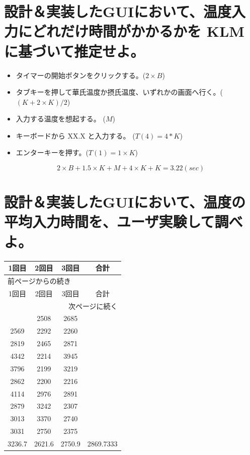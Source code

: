 \documentclass{scrartcl}
\begin{document}
\section{設計＆実装したGUIにおいて、温度入力にどれだけ時間がかかるかを KLM に基づいて推定せよ。}
\label{sec:org655c47f}
\begin{itemize}
\item タイマーの開始ボタンをクリックする。(\(2\times B\))\\
\item タブキーを押して華氏温度か摂氏温度、いずれかの画面へ行く。(\((K + 2 \times K) / 2\))\\
\item 入力する温度を想起する。 (\(M\))\\
\item キーボードから XX.X と入力する。 (\(T(4)=4*K\))\\
\item エンターキーを押す。(\(T(1)=1\times K\))\\
\end{itemize}
\begin{equation*}
2\times B + 1.5 \times K + M + 4 \times K + K = 3.22(sec)
\end{equation*}
\section{設計＆実装したGUIにおいて、温度の平均入力時間を、ユーザ実験して調べよ。}
\label{sec:orgb3f5f3b}
\begin{longtable}{|c|c|c||c|}
\hline
1回目 & 2回目 & 3回目 & 合計\\
\hline
\endfirsthead
\multicolumn{4}{l}{前ページからの続き} \\
\hline

1回目 & 2回目 & 3回目 & 合計 \\

\hline
\endhead
\hline\multicolumn{4}{r}{次ページに続く} \\
\endfoot
\endlastfoot
\hline
2942 & 2508 & 2685 & \\
2569 & 2292 & 2260 & \\
2819 & 2465 & 2871 & \\
4342 & 2214 & 3945 & \\
3796 & 2199 & 3219 & \\
2862 & 2200 & 2216 & \\
4114 & 2976 & 2891 & \\
2879 & 3242 & 2307 & \\
3013 & 3370 & 2740 & \\
3031 & 2750 & 2375 & \\
\hline
3236.7 & 2621.6 & 2750.9 & 2869.7333\\
\hline
\end{longtable}
\end{document}
